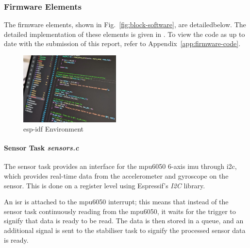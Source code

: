 \subsubsection{Firmware Elements}

The firmware elements, shown in Fig.~\ref{fig:block-software}, are detailedbelow. The detailed implementation of these elements is given in \cite{flightcontroller_git}. To view the code as up to date with the submission of this report, refer to Appendix~\ref{app:firmware-code}.

\begin{figure}[H]
    \centering
    \captionsetup{justification=centering, margin=1cm}
    \includegraphics[width=0.45\textwidth]{img/firmware-flavour2.jpeg}
    \caption{\gls{esp-idf} Environment}
    \label{fig:frame}
\end{figure}

\paragraph{\textbf{Sensor Task} \textit{sensors.c}} \leavevmode

The sensor task provides an interface for the \gls{mpu6050} 6-axis \gls{imu} through \gls{i2c}, which provides real-time data from the accelerometer and gyroscope on the sensor. This is done on a register level using Espressif's \textit{I2C} library.

An \gls{isr} is attached to the \gls{mpu6050} interrupt; this means that instead of the sensor task continuously reading from the \gls{mpu6050}, it waits for the trigger to signify that data is ready to be read. The data is then stored in a queue, and an additional signal is sent to the stabiliser task to signify the processed sensor data is ready.

